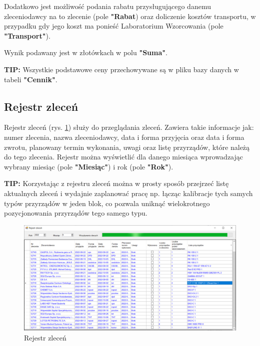 Dodatkowo jest możliwość podania rabatu przysługującego danemu zleceniodawcy na to zlecenie (pole \textbf{"Rabat}) oraz doliczenie kosztów transportu, w przypadku gdy jego koszt ma ponieść Laboratorium Wzorcowania (pole \textbf{"Transport"}).

Wynik podawany jest w złotówkach w polu \textbf{"Suma"}.

\textbf{TIP:} Wszystkie podstawowe ceny przechowywane są w pliku bazy danych w tabeli \textbf{"Cennik"}. 


\subsection{Rejestr zleceń}
\label{rejestr}

Rejestr zleceń (rys. \ref{rejestrZlecen}) służy do przeglądania zleceń. Zawiera takie informacje jak: numer zlecenia, nazwa zleceniodawcy, data i forma przyjęcia oraz data i forma zwrotu, planowany termin wykonania, uwagi oraz listę przyrządów, które należą do tego zlecenia.
Rejestr można wyświetlić dla danego miesiąca wprowadzając wybrany miesiąc (pole \textbf{"Miesiąc"}) i rok (pole \textbf{"Rok"}). 

\textbf{TIP:} Korzystając z rejestru zleceń można w prosty sposób przejrzeć listę aktualnych zleceń i wydajnie zaplanować pracę np. łącząc kalibracje tych samych typów przyrządów w jeden blok, co pozwala uniknąć wielokrotnego pozycjonowania przyrządów tego samego typu.

\begin{figure}
	\centering
	\includegraphics[width=\columnwidth]{obrazki/Biuro/rejestr_zlecen.png}
	\caption{Rejestr zleceń}
	\label{rejestrZlecen}
\end{figure}